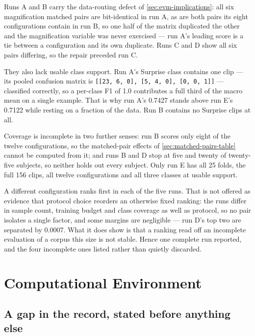 Runs A and B carry the data-routing defect of \autoref{sec:evm-implications}: all six magnification matched pairs are bit-identical in run A, as are both pairs its eight configurations contain in run B, so one half of the matrix duplicated the other and the magnification variable was never exercised --- run A's leading score is a tie between a configuration and its own duplicate. Runs C and D show all six pairs differing, so the repair preceded run C.

They also lack usable class support. Run A's Surprise class contains one clip --- its pooled confusion matrix is \verb|[[23, 6, 0], [5, 4, 0], [0, 0, 1]]| --- classified correctly, so a per-class F1 of 1.0 contributes a full third of the macro mean on a single example. That is why run A's 0.7427 stands above run E's 0.7122 while resting on a fraction of the data. Run B contains no Surprise clips at all.

Coverage is incomplete in two further senses: run B scores only eight of the twelve configurations, so the matched-pair effects of \autoref{sec:matched-pairs-table} cannot be computed from it; and runs B and D stop at five and twenty of twenty-five subjects, so neither holds out every subject. Only run E has all 25 folds, the full 156 clips, all twelve configurations and all three classes at usable support.

A different configuration ranks first in each of the five runs. That is not offered as evidence that protocol choice reorders an otherwise fixed ranking: the runs differ in sample count, training budget and class coverage as well as protocol, so no pair isolates a single factor, and some margins are negligible --- run D's top two are separated by 0.0007. What it does show is that a ranking read off an incomplete evaluation of a corpus this size is not stable. Hence one complete run reported, and the four incomplete ones listed rather than quietly discarded.


\section{Computational Environment}
\label{sec:computational-environment}

\subsection{A gap in the record, stated before anything else}
\label{sec:record-gap}

